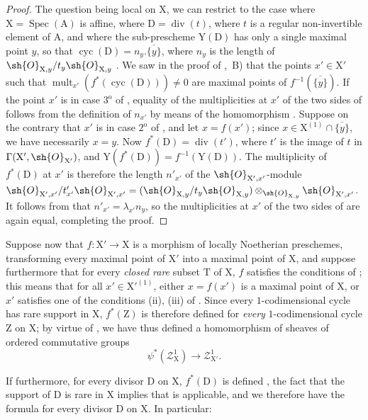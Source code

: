 \begin{proof}
The question being local on $\mathrm{X}$, we can restrict to the case where $\mathrm{X}=\operatorname{Spec}(\mathrm{A})$ is affine, where $\mathrm{D}=\operatorname{div}(t)$, where $t$ is a regular non-invertible element of $\mathrm{A}$, and where the sub-prescheme $\mathrm{Y}(\mathrm{D})$  has only a single maximal point $y$, so that $\operatorname{cyc}(\mathrm{D})=n_y.\overline{\{y\}}$, where $n_y$ is the length of $\sh{O}_{\mathrm{X},y}/t_y\sh{O}_{\mathrm{X},y}$ .
We saw in the proof of ,~B) that the points $x'\in\mathrm{X}'$ such that $\operatorname{mult}_{x'}(f^*(\operatorname{cyc}(\mathrm{D})))\neq 0$ are maximal points of $f^{-1}(\overline{\{y\}})$.
If the point $x'$ is in case $3^{\mathrm{o}}$ of , equality of the multiplicities at $x'$ of the two sides of  follows from the definition of $n_{x'}$ by means of the homomorphism .
Suppose on the contrary that $x'$ is in case $2^{\mathrm{o}}$ of , and let $x=f(x')$; since $x\in\mathrm{X}^{(1)}\cap\overline{\{y\}}$, we have necessarily $x=y$.
Now $f^*(\mathrm{D})=\operatorname{div}(t')$, where $t'$ is the image of $t$ in $\Gamma(\mathrm{X}',\sh{O}_{\mathrm{X}'})$, and $\mathrm{Y}(f^*(\mathrm{D}))=f^{-1}(\mathrm{Y}(\mathrm{D}))$.
The multiplicity of $f^*(\mathrm{D})$ at $x'$ is therefore the length $n'_{x'}$ of the $\sh{O}_{\mathrm{X}',x'}$-module
$\sh{O}_{\mathrm{X}',x'}/t'_{x'}\sh{O}_{\mathrm{X}',x'}=(\sh{O}_{\mathrm{X},y}/t_y\sh{O}_{\mathrm{X},y})\otimes_{\sh{O}_{\mathrm{X},y}}\sh{O}_{\mathrm{X}',x'}$.
It follows from  that $n'_{x'}=\lambda_{x'}n_y$, so the multiplicities at $x'$ of the two sides of  are again equal, completing the proof.
\end{proof}

\begin{env}[21.10.5]
\label{IV.21.10.5}
Suppose now that $f:\mathrm{X}'\to\mathrm{X}$ is a morphism of locally Noetherian preschemes, transforming every maximal point of $\mathrm{X}'$ into a maximal point of $\mathrm{X}$, and suppose furthermore that for every \emph{closed rare} subset $\mathrm{T}$ of $\mathrm{X}$, $f$ satisfies the conditions of ; this means that for all $x'\in\mathrm{X}'^{(1)}$, either $x=f(x')$ is a maximal point of $\mathrm{X}$, or $x'$ satisfies one of the conditions (ii), (iii) of .
Since every $1$-codimensional cycle has rare support in $\mathrm{X}$, $f^*(\mathrm{Z})$ is therefore defined for \emph{every} $1$-codimensional cycle $\mathrm{Z}$ on $\mathrm{X}$; by virtue of , we have thus defined a homomorphism of sheaves of ordered commutative groups
\[
  \psi^*(\mathscr{Z}^1_{\mathrm{X}})\to\mathscr{Z}^1_{\mathrm{X}'}.
\]

If furthermore, for every divisor $\mathrm{D}$ on $\mathrm{X}$, $f^*(\mathrm{D})$ is defined , the fact that the support of $\mathrm{D}$ is rare in $\mathrm{X}$  implies that  is applicable, and we therefore have the formula  for every divisor $\mathrm{D}$ on $\mathrm{X}$.
In particular:
\end{env}

